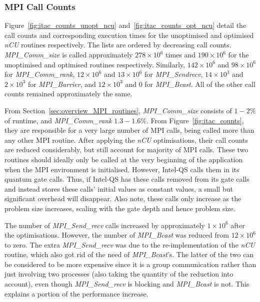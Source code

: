 \subsubsection{MPI Call Counts}
Figure~\ref{fig:itac_counts_unopt_ncu} and~\ref{fig:itac_counts_opt_ncu} detail the call counts and corresponding execution times for the unoptimised and optimised \textit{nCU} routines respectively. The lists are ordered by decreasing call counts. \textit{MPI\_Comm\_size} is called approximately $278\times10^6$ times and $190\times10^6$ for the unoptimised and optimised routines respectively. Similarly, $142\times10^6$ and $98\times10^6$ for \textit{MPI\_Comm\_rank}, $12\times10^6$ and $13\times10^6$ for \textit{MPI\_Sendrecv}, $14\times10^3$ and $2\times10^3$ for \textit{MPI\_Barrier}, and $12\times10^3$ and $0$ for \textit{MPI\_Bcast}. All of the other call counts remained approximately the same.

From Section~\ref{sec:overview_MPI_routines}, \textit{MPI\_Comm\_size} consists of $1-2\%$ of runtime, and \textit{MPI\_Comm\_rank} $1.3-1.6\%$. From Figure~\ref{fig:itac_counts}, they are responsible for a very large number of MPI calls, being called more than any other MPI routine. After applying the \textit{nCU} optimisations, their call counts are reduced considerably, but still account for majority of MPI calls. These two routines should ideally only be called at the very beginning of the application when the MPI environment is initialised. However, Intel\textregistered-QS calls them in its quantum gate calls. Thus, if Intel\textregistered-QS has these calls removed  from its gate calls and instead stores these calls' initial values as constant values, a small but significant overhead will disappear. Also note, these calls only increase as the problem size increases, scaling with the gate depth and hence problem size.

The number of \textit{MPI\_Send\_recv} calls increased by approximately $1\times10^6$ after the optimisations. However, the number of \textit{MPI\_Bcast} was reduced from $12\times10^6$ to zero. The extra \textit{MPI\_Send\_recv} was due to the re-implementation of the \textit{nCU} routine, which also got rid of the need of \textit{MPI\_Bcast}'s. The latter of the two can be considered to be more expensive since it is a group communication rather than just involving two processes (also taking the quantity of the reduction into account), even though \textit{MPI\_Send\_recv} is blocking and \textit{MPI\_Bcast} is not. This explains a portion of the performance increase.


